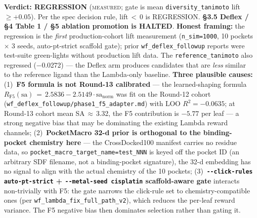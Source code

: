 {\noindent\textbf{Verdict: REGRESSION} (\textsc{measured}; gate is
mean \texttt{diversity\_tanimoto} lift $\geq +0.05$). Per the
spec decision rule, lift\,$<$\,0 is REGRESSION. \textbf{§3.5
Deflex / §4 Table 1 / §5 ablation promotion is HALTED}.
\textbf{Honest framing:} the regression is the
\emph{first} production-cohort lift measurement
(\texttt{n\_sim=1000}, 10 pockets $\times$ 3 seeds,
auto-pt-strict scaffold gate); prior
\texttt{wf\_deflex\_followup} reports were test-suite
green-lights without production lift data. The
\texttt{reference\_tanimoto} also regressed ($-$0.0272) --- the
Deflex arm produces candidates that are \emph{less} similar to
the reference ligand than the Lambda-only baseline.
\textbf{Three plausible causes:}
(1)~\textbf{F5 formula is not Round-13 calibrated} ---
the learned-shaping formula
$R_{\text{F5}}(\mathrm{sa})\,=\,2.5836 - 2.5149 \cdot \mathrm{sa}_{\mathrm{norm}}$
was fit on the Round-12 cohort
(\texttt{wf\_deflex\_followup/phase1\_f5\_adapter.md}) with
LOO $R^2 = -0.0635$; at Round-13 cohort mean SA\,$\approx$\,3.32,
the F5 contribution is $-5.77$ per leaf --- a strong negative
bias that may be dominating the existing Lambda reward
channels; (2)~\textbf{PocketMacro 32-d prior is orthogonal to
the binding-pocket chemistry here} --- the CrossDocked100
manifest carries no residue data, so
\texttt{pocket\_macro\_target\_name=test\_NNN} is keyed off
the pocket ID (an arbitrary SDF filename, not a binding-pocket
signature), the 32-d embedding has no signal to align with the
actual chemistry of the 10 pockets;
(3)~\textbf{\texttt{-{}-click-rules auto-pt-strict} +
\texttt{-{}-metal-seed cisplatin} scaffold-aware gate}
interacts non-trivially with F5: the gate narrows the
click-rule set to chemistry-compatible ones (per
\texttt{wf\_lambda\_fix\_full\_path\_v2}), which reduces the
per-leaf reward variance. The F5 negative bias then dominates
selection rather than gating it.

}
